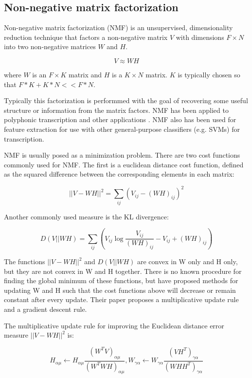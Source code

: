 \documentclass[5p]{elsarticle}
\begin{document}
\subsection{Non-negative matrix factorization}

Non-negative matrix factorization (NMF) is an unsupervised, dimensionality reduction technique that factors a non-negative matrix $V$ with dimensions $F \times N$ into two non-negative matrices $W$ and $H$.

\[ V \approx WH \]

\noindent where $W$ is an $F \times K$ matrix and $H$ is a $K \times N$ matrix. $K$ is typically chosen so that $F*K + K*N << F*N$.

Typically this factorization is performmed with the goal of recovering some useful structure or information from the matrix factors. NMF has been applied to polyphonic transcription and other applications \cite{smaragdis2003non}. NMF also has been used for feature extraction for use with other general-purpose classifiers (e.g. SVMs) for transcription.

NMF is usually posed as a minimization problem. There are two cost functions commonly used for NMF. The first is a euclidean distance cost function, defined as the squared difference between the corresponding elements in each matrix:

\[ \displaystyle ||V-WH||^{2} = \sum_{ij} (V_{ij} - (WH)_{ij})^{2} \]

\noindent Another commonly used measure is the KL divergence:

\[ \displaystyle D(V||WH) = \sum_{ij} (V_{ij} \log \frac{V_{ij}}{(WH)_{ij}} - V_{ij} + (WH)_{ij}) \]


The functions $||V-WH||^{2}$ and $D(V||WH)$ are convex in W only and H only, but they are not convex in W and H together. There is no known procedure for finding the global minimum of these functions, but \citet{seung2001algorithms} have proposed methods for updating W and H such that the cost functions above will decrease or remain constant after every update. Their paper proposes a multiplicative update rule and a gradient descent rule.

The multiplicative update rule for improving the Euclidean distance error measure $||V-WH||^{2}$ is:

\[ H_{\alpha \mu} \leftarrow H_{\alpha \mu} \frac{ (W^{T} V)_{\alpha \mu}}{(W^{T} W H )_{\alpha \mu}}, W_{\gamma \alpha} \leftarrow W_{\gamma \alpha} \frac{ (V H^{T})_{\gamma \alpha}} {(W H H^{T})_{\gamma \alpha}} \]
\end{document}
